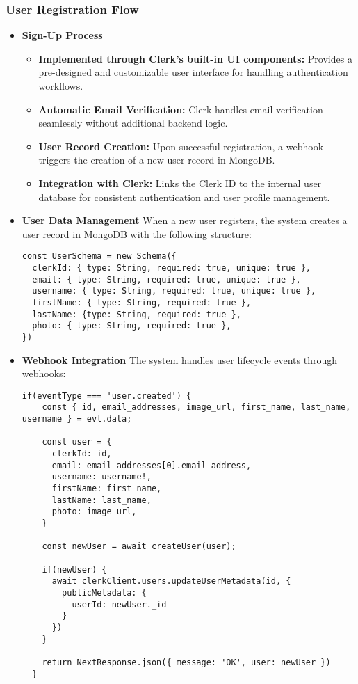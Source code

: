 \subsubsection{User Registration Flow}
\begin{itemize}
    \item \textbf{Sign-Up Process}
    \begin{itemize}
    \item \textbf{Implemented through Clerk's built-in UI components:} Provides a pre-designed and customizable user interface for handling authentication workflows.
    \item \textbf{Automatic Email Verification:} Clerk handles email verification seamlessly without additional backend logic.
    \item \textbf{User Record Creation:} Upon successful registration, a webhook triggers the creation of a new user record in MongoDB.
    \item \textbf{Integration with Clerk:} Links the Clerk ID to the internal user database for consistent authentication and user profile management.
\end{itemize}

    \item \textbf{User Data Management}  
    When a new user registers, the system creates a user record in MongoDB with the following structure:
\begin{lstlisting}[style=typescript, caption={User Data Management}]
const UserSchema = new Schema({
  clerkId: { type: String, required: true, unique: true },
  email: { type: String, required: true, unique: true },
  username: { type: String, required: true, unique: true },
  firstName: { type: String, required: true },
  lastName: {type: String, required: true },
  photo: { type: String, required: true },
})
\end{lstlisting}



    \item \textbf{Webhook Integration}  
    The system handles user lifecycle events through webhooks:
\begin{lstlisting}[style=typescript, caption={Webhook Integration}]
  if(eventType === 'user.created') {
    const { id, email_addresses, image_url, first_name, last_name, username } = evt.data;

    const user = {
      clerkId: id,
      email: email_addresses[0].email_address,
      username: username!,
      firstName: first_name,
      lastName: last_name,
      photo: image_url,
    }

    const newUser = await createUser(user);

    if(newUser) {
      await clerkClient.users.updateUserMetadata(id, {
        publicMetadata: {
          userId: newUser._id
        }
      })
    }

    return NextResponse.json({ message: 'OK', user: newUser })
  }
\end{lstlisting}    
\end{itemize}

